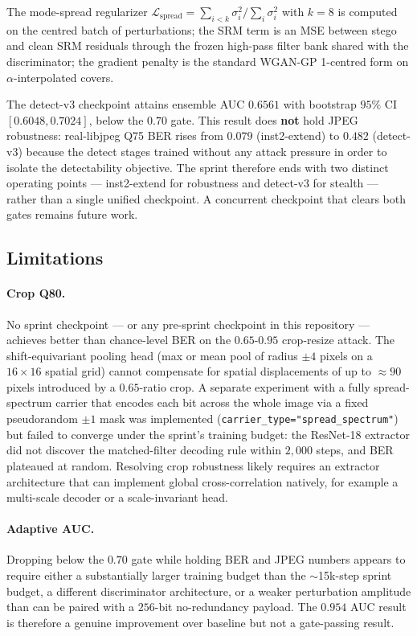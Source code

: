 The mode-spread regularizer
$\mathcal{L}_{\mathrm{spread}} = \sum_{i<k}\sigma_i^{2}/\sum_{i}\sigma_i^{2}$
with $k{=}8$ is computed on the centred batch of perturbations; the
SRM term is an MSE between stego and clean SRM residuals through the
frozen high-pass filter bank shared with the discriminator; the
gradient penalty is the standard WGAN-GP 1-centred form on
$\alpha$-interpolated covers.

The detect-v3 checkpoint attains ensemble AUC $0.6561$ with bootstrap
$95\%$ CI $[0.6048, 0.7024]$, below the $0.70$ gate. This result does
\textbf{not} hold JPEG robustness: real-libjpeg Q75 BER rises from
$0.079$ (inst2-extend) to $0.482$ (detect-v3) because the detect stages
trained without any attack pressure in order to isolate the
detectability objective. The sprint therefore ends with two distinct
operating points — inst2-extend for robustness and detect-v3 for
stealth — rather than a single unified checkpoint. A concurrent
checkpoint that clears both gates remains future work.

\subsection{Limitations}

\paragraph{Crop Q80.}
No sprint checkpoint — or any pre-sprint checkpoint in this repository
— achieves better than chance-level BER on the $0.65$-$0.95$ crop-resize
attack. The shift-equivariant pooling head (max or mean pool of radius
$\pm 4$ pixels on a $16\times 16$ spatial grid) cannot compensate for
spatial displacements of up to $\approx 90$ pixels introduced by a
$0.65$-ratio crop. A separate experiment with a fully spread-spectrum
carrier that encodes each bit across the whole image via a fixed
pseudorandom $\pm 1$ mask was implemented
(\texttt{carrier\_type="spread\_spectrum"}) but failed to converge under
the sprint's training budget: the ResNet-18 extractor did not discover
the matched-filter decoding rule within $2{,}000$ steps, and BER
plateaued at random. Resolving crop robustness likely requires an
extractor architecture that can implement global cross-correlation
natively, for example a multi-scale decoder or a scale-invariant head.

\paragraph{Adaptive AUC.}
Dropping below the $0.70$ gate while holding BER and JPEG numbers
appears to require either a substantially larger training budget than
the $\sim$15k-step sprint budget, a different discriminator
architecture, or a weaker perturbation amplitude than can be paired
with a $256$-bit no-redundancy payload. The $0.954$ AUC result is
therefore a genuine improvement over baseline but not a gate-passing
result.

